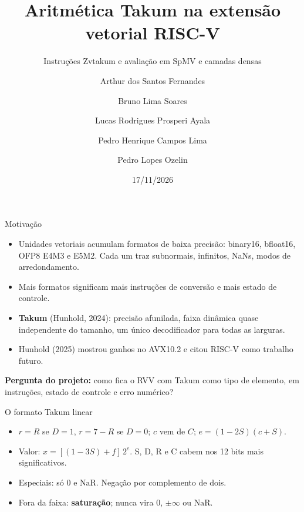 \documentclass[aspectratio=169,10pt]{beamer}
\title{Aritmética Takum na extensão vetorial RISC-V}
\subtitle{Instruções Zvtakum e avaliação em SpMV e camadas densas}
\author{Arthur dos Santos Fernandes \and Bruno Lima Soares \and Lucas Rodrigues Prosperi Ayala
  \and Pedro Henrique Campos Lima \and Pedro Lopes Ozelin}
\institute{Arquitetura e Organização de Computadores, DELT/UFMG, 2026/2}
\date{17/11/2026}
\newcommand{\NaR}{\mathrm{NaR}}
\begin{document}
\begin{frame}
\titlepage
\end{frame}

\begin{frame}{Motivação}
\begin{itemize}
\item Unidades vetoriais acumulam formatos de baixa precisão: binary16, bfloat16,
  OFP8 E4M3 e E5M2. Cada um traz subnormais, infinitos, NaNs, modos de arredondamento.
\item Mais formatos significam mais instruções de conversão e mais estado de controle.
\item \textbf{Takum} (Hunhold, 2024): precisão afunilada, faixa dinâmica quase
  independente do tamanho, um único decodificador para todas as larguras.
\item Hunhold (2025) mostrou ganhos no AVX10.2 e citou RISC-V como trabalho futuro.
\end{itemize}
\vspace{1em}
\textbf{Pergunta do projeto:} como fica o RVV com Takum como tipo de elemento,
em instruções, estado de controle e erro numérico?
\end{frame}

\begin{frame}{O formato Takum linear}
\centering
{}
\vspace{1em}
\begin{itemize}
\item $r=R$ se $D=1$, $r=7-R$ se $D=0$; $c$ vem de $C$; $e=(1-2S)(c+S)$.
\item Valor: $x=[(1-3S)+f]\,2^e$. S, D, R e C cabem nos 12 bits mais significativos.
\item Especiais: só $0$ e $\NaR$. Negação por complemento de dois.
\item Fora da faixa: \textbf{saturação}; nunca vira $0$, $\pm\infty$ ou $\NaR$.
\end{itemize}
\end{frame}
\end{document}
